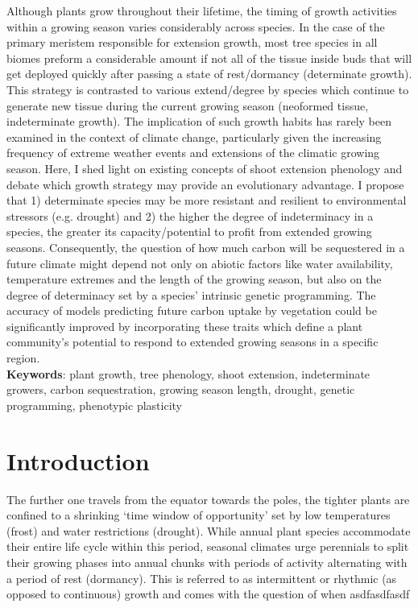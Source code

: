 \documentclass{article}
\begin{document}
	Although plants grow throughout their lifetime, the timing of growth activities within a growing season varies considerably across species. In the case of the primary meristem responsible for extension growth, most tree species in all biomes preform a considerable amount if not all of the tissue inside buds that will get deployed quickly after passing a state of rest/dormancy (determinate growth). This strategy is contrasted to various extend/degree by species which continue to generate new tissue during the current growing season (neoformed tissue, indeterminate growth). The implication of such growth habits has rarely been examined in the context of climate change, particularly given the increasing frequency of extreme weather events and extensions of the climatic growing season.  Here, I shed light on existing concepts of shoot extension phenology and debate which growth strategy may provide an evolutionary advantage. I propose that 1) determinate species may be more resistant and resilient to environmental stressors (e.g. drought) and 2) the higher the degree of indeterminacy in a species, the greater its capacity/potential to profit from extended growing seasons. Consequently, the question of how much carbon will be sequestered in a future climate might depend not only on abiotic factors like water availability, temperature extremes and the length of the growing season, but also on the degree of determinacy set by a species' intrinsic genetic programming. The accuracy of models predicting future carbon uptake by vegetation could be significantly improved by incorporating these traits which define a plant community's potential to respond to extended growing seasons in a specific region.
	\\
	
	\textbf{Keywords}: plant growth, tree phenology, shoot extension, indeterminate growers, carbon sequestration, growing season length, drought, genetic programming, phenotypic plasticity
	
	
	\section*{Introduction}
	The further one travels from the equator towards the poles, the tighter plants are confined to a shrinking ‘time window of opportunity’ set by low temperatures (frost) and water restrictions (drought). While annual plant species accommodate their entire life cycle within this period, seasonal climates urge perennials to split their growing phases into annual chunks with periods of activity alternating with a period of rest (dormancy). This is referred to as intermittent or rhythmic (as opposed to continuous) growth and comes with the question of when \citep{borchertClimaticPeriodicityPhenology1999, borchertComputeraidedEvaluationShootgrowth1976}
	\citet{boojhGrowthStrategyTrees1982}  
	\citep{borchertClimaticPeriodicityPhenology1999}
	\citep{rossiPatternXylemPhenology2016a}
	\cite{} 
	asdfasdfasdf
\end{document}
